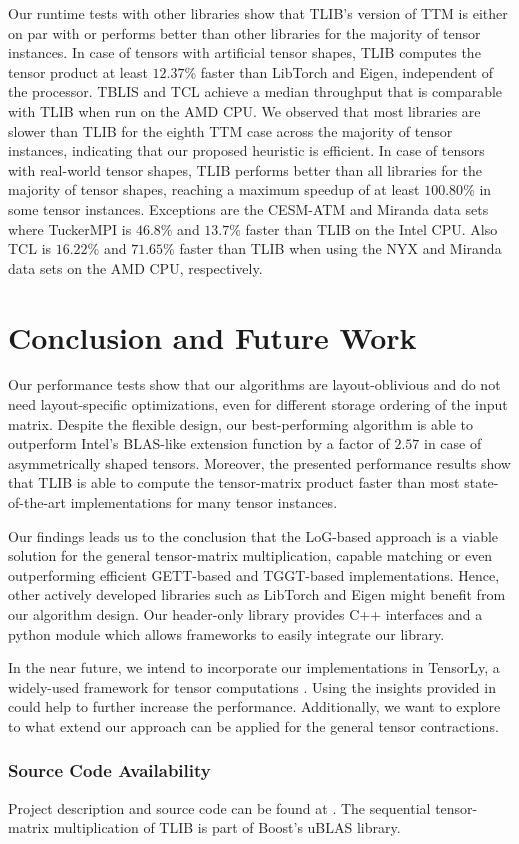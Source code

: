 Our runtime tests with other libraries show that TLIB's  version of TTM is either on par with or performs better than other libraries for the majority of tensor instances.
In case of tensors with artificial tensor shapes, TLIB computes the tensor product at least $12.37$\% faster than LibTorch and Eigen, independent of the processor.
TBLIS and TCL achieve a median throughput that is comparable with TLIB when run on the AMD CPU.
We observed that most libraries are slower than TLIB for the eighth TTM case across the majority of tensor instances, indicating that our proposed heuristic is efficient.
In case of tensors with real-world tensor shapes, TLIB performs better than all libraries for the majority of tensor shapes, reaching a maximum speedup of at least $100.80$\% in some tensor instances.
Exceptions are the CESM-ATM and Miranda data sets where TuckerMPI is $46.8$\% and $13.7$\% faster than TLIB on the Intel CPU.
Also TCL is $16.22$\% and $71.65$\% faster than TLIB when using the NYX and Miranda data sets on the AMD CPU, respectively.


\section{Conclusion and Future Work}
\label{sec:conclusion}
Our performance tests show that our algorithms are layout-oblivious and do not need layout-specific optimizations, even for different storage ordering of the input matrix.
Despite the flexible design, our best-performing algorithm is able to outperform Intel's BLAS-like extension function  by a factor of $2.57$ in case of asymmetrically shaped tensors.
Moreover, the presented performance results show that TLIB is able to compute the tensor-matrix product faster than most state-of-the-art implementations for many tensor instances.

Our findings leads us to the conclusion that the LoG-based approach is a viable solution for the general tensor-matrix multiplication, capable matching or even outperforming efficient GETT-based and TGGT-based implementations.
Hence, other actively developed libraries such as LibTorch and Eigen might benefit from our algorithm design.
Our header-only library provides C++ interfaces and a python module which allows frameworks to easily integrate our library.

In the near future, we intend to incorporate our implementations in TensorLy, a widely-used framework for tensor computations \cite{cohen:2022:tensor.computations, kossaifi:2019:tensorly}.
Using the insights provided in \cite{li:2015:input} could help to further increase the performance.
Additionally, we want to explore to what extend our approach can be applied for the general tensor contractions.

\subsubsection{Source Code Availability}
Project description and source code can be found at .
The sequential tensor-matrix multiplication of TLIB is part of Boost's uBLAS library.